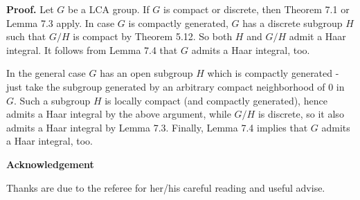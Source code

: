 \documentclass[12pt]{article}
\begin{document}
\textbf{Proof.} Let $G$ be a LCA group. If $G$ is compact or discrete, then Theorem 7.1 or Lemma 7.3 apply. In case $G$ is compactly
generated, $G$ has a discrete subgroup $H$ such that $G/H$ is compact by Theorem 5.12. So both $H$ and $G/H$ admit a Haar
integral. It follows from Lemma 7.4 that $G$ admits a Haar integral, too.


    In the general case $G$ has an open subgroup $H$ which is compactly generated - just take the subgroup generated by an
arbitrary compact neighborhood of 0 in $G$. Such a subgroup $H$ is locally compact (and compactly generated), hence admits
a Haar integral by the above argument, while $G/H$ is discrete, so it also admits a Haar integral by Lemma 7.3. Finally,
Lemma 7.4 implies that $G$ admits a Haar integral, too.


\textbf{Acknowledgement}


Thanks are due to the referee for her/his careful reading and useful advise.
\end{document}

